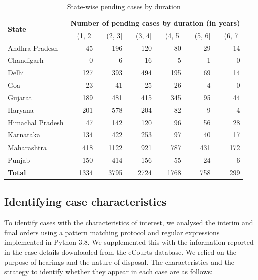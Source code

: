 \documentclass[12pt,a4paper]{article}
\begin{document}
\begin{table}[!ht]
\caption{State-wise pending cases by duration} \label{tab:state_pending}
\centering
\footnotesize
\begin{tabular}{lrrrrrr}
\toprule
\multirow{2}{*}{\textbf{State}} & \multicolumn{6}{c}{\textbf{Number of pending cases by duration (in years)}} \\
\cmidrule{2-7}
& (1, 2] & (2, 3] & (3, 4] & (4, 5] & (5, 6] & (6, 7] \\
\midrule
Andhra Pradesh & 45 & 196 & 120 & 80 & 29 & 14 \\
Chandigarh & 0 & 6 & 16 & 5 & 1 & 0 \\
Delhi & 127 & 393 & 494 & 195 & 69 & 14 \\
Goa & 23 & 41 & 25 & 26 & 4 & 0 \\
Gujarat & 189 & 481 & 415 & 345 & 95 & 44 \\
Haryana & 201 & 578 & 204 & 82 & 9 & 4 \\
Himachal Pradesh & 47 & 142 & 120 & 96 & 56 & 28 \\
Karnataka & 134 & 422 & 253 & 97 & 40 & 17 \\
Maharashtra & 418 & 1122 & 921 & 787 & 431 & 172 \\
Punjab & 150 & 414 & 156 & 55 & 24 & 6 \\
\midrule
\textbf{Total} & 1334 & 3795 & 2724 & 1768 & 758 & 299 \\
\bottomrule
\end{tabular}
\end{table}

\subsection{Identifying case characteristics} \label{sec:text-mining}

To identify cases with the characteristics of interest, we analysed the interim and final orders using a pattern matching protocol and regular expressions implemented in Python 3.8. We supplemented this with the information reported in the case details downloaded from the eCourts database. We relied on the purpose of hearings and the nature of disposal. The characteristics and the strategy to identify whether they appear in each case are as follows:
\end{document}
